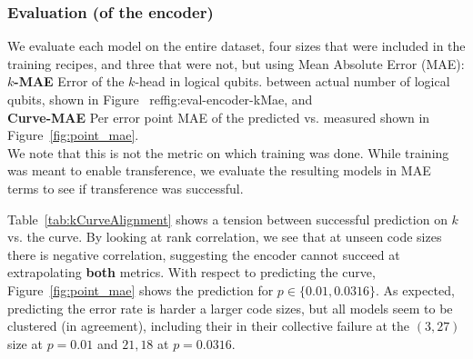 \subsubsection{Evaluation (of the encoder)\label{sec:encoderEvaluation}}
\noindent We evaluate each model on the entire dataset, four sizes that were included in the training recipes, and three that were not, 
but using Mean Absolute Error (MAE):\\
\noindent \textbf{\(k\)-MAE} Error of the \(k\)-head in logical qubits. between actual number of logical qubits, shown in Figure~ ref{fig:eval-encoder-kMae}, and \\
\noindent \textbf{Curve-MAE} Per error point MAE of the predicted vs. measured shown in Figure~\ref{fig:point_mae}.\\
\noindent We note that this is not the metric on which training was done. While training was meant to enable transference, we evaluate the resulting models in MAE terms to see if transference was successful.

\noindent Table~\ref{tab:kCurveAlignment} shows a tension between successful prediction on \(k\) vs. the curve. 
By looking at rank correlation, we see that at unseen code sizes there is negative correlation, suggesting the encoder cannot succeed at extrapolating \textbf{both} metrics.
With respect to predicting the curve, Figure~\ref{fig:point_mae} shows the prediction for \(p\in\{0.01,0.0316\}\). As expected, predicting the error rate is harder a larger code sizes, but all models seem to be clustered (in agreement), including their in their collective failure at the \((3,27)\) size at \(p=0.01\) and \(21,18\) at \(p=0.0316\).

